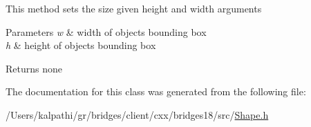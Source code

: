 This method sets the size given height and width arguments


\begin{DoxyParams}{Parameters}
{\em w} & width of object\textquotesingle{}s bounding box \\
\hline
{\em h} & height of object\textquotesingle{}s bounding box\\
\hline
\end{DoxyParams}
\begin{DoxyReturn}{Returns}
none 
\end{DoxyReturn}


The documentation for this class was generated from the following file\+:\begin{DoxyCompactItemize}
\item 
/\+Users/kalpathi/gr/bridges/client/cxx/bridges18/src/\mbox{\hyperlink{_shape_8h}{Shape.\+h}}\end{DoxyCompactItemize}
